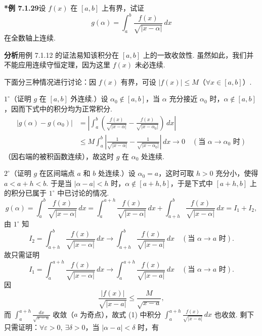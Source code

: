 \documentclass[UTF8,12pt,a4paper,fontset=fandol]{ctexart}
\begin{document}
\noindent\textbf{*例 7.1.29}\quad 设 $f(x)$ 在 $[a,b]$ 上有界，试证
\[
g(\alpha)=\int_a^b\frac{f(x)}{\sqrt{|x-\alpha|}}\,dx
\]
在全数轴上连续.

\noindent\textbf{分析}\quad 用例 7.1.12 的证法易知该积分在 $[a,b]$ 上的一致收敛性. 虽然如此，我们并不能应用连续守恒定理，因为这里 $f(x)$ 未必连续.

下面分三种情况进行讨论：因 $f(x)$ 有界，可设 $|f(x)|\le M$（$\forall x\in[a,b]$）.

$1^\circ$（证明 $g$ 在 $[a,b]$ 外连续.）设 $\alpha_0\notin[a,b]$，当 $\alpha$ 充分接近 $\alpha_0$ 时，$\alpha\notin[a,b]$，因而下式中的积分均为正常积分.
\[
\begin{aligned}
|g(\alpha)-g(\alpha_0)|
&=\left|\int_a^b\left(\frac{f(x)}{\sqrt{|x-\alpha|}}-\frac{f(x)}{\sqrt{|x-\alpha_0|}}\right)\,dx\right|\\
&\le M\int_a^b\left|\frac1{\sqrt{|x-\alpha|}}-\frac1{\sqrt{|x-\alpha_0|}}\right|\,dx\to0
\quad(\text{当 }\alpha\to\alpha_0\text{ 时})
\end{aligned}
\]
（因右端的被积函数连续），故这时 $g$ 在 $\alpha_0$ 处连续.

$2^\circ$（证明 $g$ 在区间端点 $a$ 和 $b$ 处连续.）设 $\alpha_0=a$，这时可取 $h>0$ 充分小，使得 $a<a+h<b$. 于是当 $|\alpha-a|<h$ 时，$\alpha\notin[a+h,b]$，于是下式中 $[a+h,b]$ 上的积分已属于 $1^\circ$ 中已讨论的情况.
\[
g(\alpha)=\int_a^b\frac{f(x)}{\sqrt{|x-\alpha|}}\,dx
=\int_a^{a+h}\frac{f(x)}{\sqrt{|x-\alpha|}}\,dx
+\int_{a+h}^b\frac{f(x)}{\sqrt{|x-\alpha|}}\,dx
=I_1+I_2,
\]
由 $1^\circ$ 知
\[
I_2=\int_{a+h}^b\frac{f(x)}{\sqrt{|x-\alpha|}}\,dx
\to\int_{a+h}^b\frac{f(x)}{\sqrt{|x-a|}}\,dx
\quad(\text{当 }\alpha\to a\text{ 时}).
\]
故只需证明
\begin{equation}
I_1=\int_a^{a+h}\frac{f(x)}{\sqrt{|x-\alpha|}}\,dx
\to\int_a^{a+h}\frac{f(x)}{\sqrt{|x-a|}}\,dx
\quad(\text{当 }\alpha\to a\text{ 时}).
\tag{1}
\end{equation}
因
\[
\frac{|f(x)|}{\sqrt{|x-a|}}\le\frac{M}{\sqrt{x-a}},
\]
而 $\displaystyle\int_a^{a+h}\frac{dx}{\sqrt{x-a}}$ 收敛（$a$ 为奇点），故式 (1) 中积分 $\displaystyle\int_a^{a+h}\frac{f(x)}{\sqrt{|x-a|}}\,dx$ 也收敛. 剩下只需证明：$\forall\varepsilon>0,\ \exists\delta>0$，当 $|\alpha-a|<\delta$ 时，有
\end{document}
